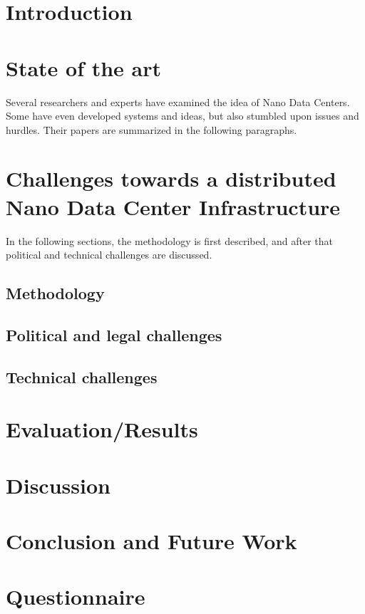 
\section{Introduction}


\section{State of the art}
\label{StateOfTheArt}
Several researchers and experts have examined the idea of Nano Data Centers. Some have even developed systems and ideas, but also stumbled upon issues and hurdles. Their papers are summarized in the following paragraphs. 




\section{Challenges towards a distributed Nano Data Center Infrastructure}
\label{sec:challenges}
In the following sections, the methodology is first described, and after that political and technical challenges are discussed. 

\subsection{Methodology}



\subsection{Political and legal challenges}


\subsection{Technical challenges}


\section{Evaluation/Results}


\section{Discussion}



\section{Conclusion and Future Work}


\begin{acks}

\end{acks}




\appendix
\section{Questionnaire}



